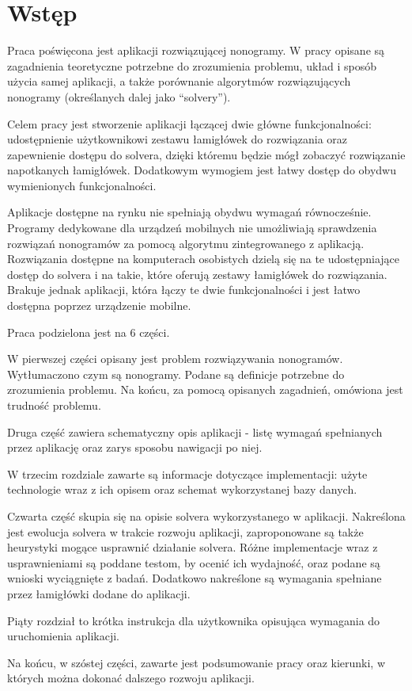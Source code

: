 \chapter*{Wstęp}

\thispagestyle{chapterBeginStyle}

	Praca poświęcona jest aplikacji rozwiązującej nonogramy. W pracy opisane są zagadnienia
teoretyczne potrzebne do zrozumienia problemu, układ i sposób użycia samej aplikacji, a także
porównanie algorytmów rozwiązujących nonogramy (określanych dalej jako ``solvery'').

	Celem pracy jest stworzenie aplikacji łączącej dwie główne funkcjonalności: udostępnienie
użytkownikowi zestawu łamigłówek do rozwiązania oraz zapewnienie dostępu do solvera, dzięki
któremu będzie mógł zobaczyć rozwiązanie napotkanych łamigłówek. Dodatkowym wymogiem jest łatwy
dostęp do obydwu wymienionych funkcjonalności.

	Aplikacje dostępne na rynku nie spełniają obydwu wymagań równocześnie. Programy dedykowane dla
urządzeń mobilnych nie umożliwiają sprawdzenia rozwiązań nonogramów za pomocą algorytmu
zintegrowanego z aplikacją. Rozwiązania dostępne na komputerach osobistych dzielą się na te udostępniające
dostęp do solvera i na takie, które oferują zestawy łamigłówek do rozwiązania. Brakuje jednak
aplikacji, która łączy te dwie funkcjonalności i jest łatwo dostępna poprzez urządzenie mobilne.

	Praca podzielona jest na 6 części.

	W pierwszej części opisany jest problem rozwiązywania nonogramów. Wytłumaczono
czym są nonogramy. Podane są definicje potrzebne do zrozumienia problemu. Na końcu, za pomocą
opisanych zagadnień, omówiona jest trudność problemu.

	Druga część zawiera schematyczny opis aplikacji - listę wymagań spełnianych przez
aplikację oraz zarys sposobu nawigacji po niej.

	W trzecim rozdziale zawarte są informacje dotyczące implementacji: użyte technologie wraz
z ich opisem oraz schemat wykorzystanej bazy danych.

	Czwarta część skupia się na opisie solvera wykorzystanego w aplikacji. Nakreślona jest ewolucja
solvera w trakcie rozwoju aplikacji, zaproponowane są także heurystyki mogące usprawnić działanie
solvera. Różne implementacje wraz z usprawnieniami są poddane testom, by ocenić ich wydajność,
oraz podane są wnioski wyciągnięte z badań. Dodatkowo nakreślone są wymagania spełniane przez
łamigłówki dodane do aplikacji.

	Piąty rozdział to krótka instrukcja dla użytkownika opisująca wymagania do uruchomienia aplikacji.

	Na końcu, w szóstej części, zawarte jest podsumowanie pracy oraz kierunki, w których
można dokonać dalszego rozwoju aplikacji.
